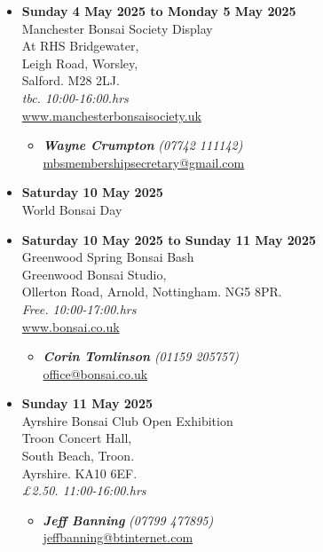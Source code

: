 \begin{itemize}
    \item \textbf{Sunday 4 May 2025 to Monday 5 May 2025}
    \\
    Manchester Bonsai Society Display \\
    At RHS Bridgewater, \\
    Leigh Road, Worsley, \\
    Salford. M28 2LJ.
    \\
    \emph{tbc. 10:00-16:00.hrs}
    \\
    \href{https://www.manchesterbonsaisociety.uk}{www.manchesterbonsaisociety.uk}
    \begin{itemize}
        \item \textbf{\emph{Wayne Crumpton}} \emph{(07742 111142)} \\
        \href{mailto:mbsmembershipsecretary@gmail.com}{mbsmembershipsecretary@gmail.com} 
    \end{itemize}

    \item \textbf{Saturday 10 May 2025}
    \\
    World Bonsai Day

    \item \textbf{Saturday 10 May 2025 to Sunday 11 May 2025}
    \\
    Greenwood Spring Bonsai Bash \\
    Greenwood Bonsai Studio, \\
    Ollerton Road, Arnold, Nottingham. NG5 8PR.
    \\
    \emph{Free. 10:00-17:00.hrs}
    \\
    \href{https://www.bonsai.co.uk}{www.bonsai.co.uk}
    \begin{itemize}
        \item \textbf{\emph{Corin Tomlinson}} \emph{(01159 205757)} \\
        \href{mailto:office@bonsai.co.uk}{office@bonsai.co.uk} 
    \end{itemize}

    \item \textbf{Sunday 11 May 2025}
    \\
    Ayrshire Bonsai Club Open Exhibition \\
    Troon Concert Hall, \\
    South Beach, Troon. \\
    Ayrshire. KA10 6EF.
    \\
    \emph{£2.50. 11:00-16:00.hrs}
    \begin{itemize}
        \item \textbf{\emph{Jeff Banning}} \emph{(07799 477895)} \\
        \href{mailto:jeffbanning@btinternet.com}{jeffbanning@btinternet.com} 
    \end{itemize}


\end{itemize}
